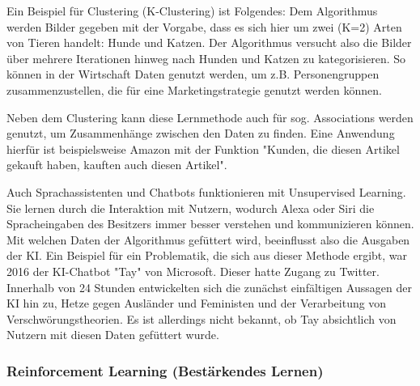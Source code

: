 \documentclass[a4paper,12pt, german]{report}
\begin{document}
Ein Beispiel für Clustering (K-Clustering) ist Folgendes: Dem Algorithmus werden Bilder gegeben mit der Vorgabe, dass es sich hier um zwei (K=2) Arten von Tieren handelt: Hunde und Katzen. Der Algorithmus versucht also die Bilder über mehrere Iterationen hinweg nach Hunden und Katzen zu kategorisieren. So können in der Wirtschaft Daten genutzt werden, um z.B. Personengruppen zusammenzustellen, die für eine Marketingstrategie genutzt werden können.

Neben dem Clustering kann diese Lernmethode auch für sog. Associations werden genutzt, um Zusammenhänge zwischen den Daten zu finden. Eine Anwendung hierfür ist beispielsweise Amazon mit der Funktion "Kunden, die diesen Artikel gekauft haben, kauften auch diesen Artikel".

Auch Sprachassistenten und Chatbots funktionieren mit Unsupervised Learning. Sie lernen durch die Interaktion mit Nutzern, wodurch Alexa oder Siri die Spracheingaben des Besitzers immer besser verstehen und kommunizieren können. Mit welchen Daten der Algorithmus gefüttert wird, beeinflusst also die Ausgaben der KI. Ein Beispiel für ein Problematik, die sich aus dieser Methode ergibt, war 2016 der KI-Chatbot "Tay" von Microsoft. Dieser hatte Zugang zu Twitter. Innerhalb von 24 Stunden entwickelten sich die zunächst einfältigen Aussagen der KI hin zu, Hetze gegen Ausländer und Feministen und der Verarbeitung von Verschwörungstheorien. Es ist allerdings nicht bekannt, ob Tay absichtlich von Nutzern mit diesen Daten gefüttert wurde. %

\subsubsection{Reinforcement Learning (Bestärkendes Lernen)} 
\end{document}

